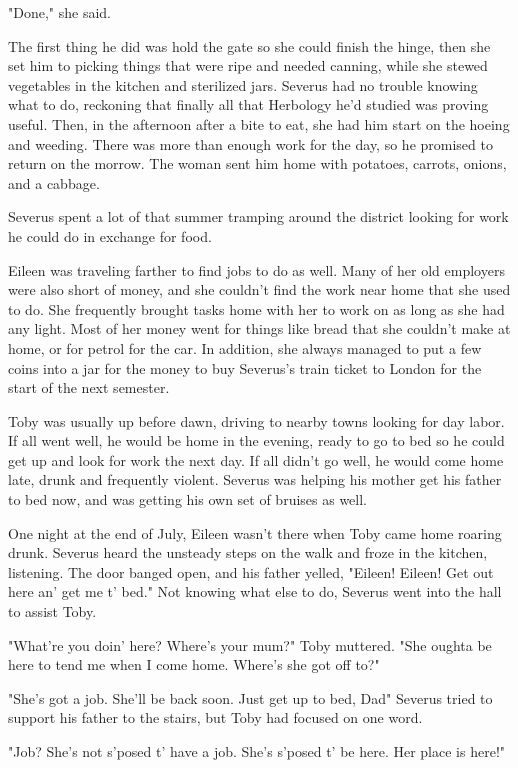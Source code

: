 "Done," she said.

The first thing he did was hold the gate so she could finish the hinge, then she set him to picking things that were ripe and needed canning, while she stewed vegetables in the kitchen and sterilized jars. Severus had no trouble knowing what to do, reckoning that finally all that Herbology he'd studied was proving useful. Then, in the afternoon after a bite to eat, she had him start on the hoeing and weeding. There was more than enough work for the day, so he promised to return on the morrow. The woman sent him home with potatoes, carrots, onions, and a cabbage.

Severus spent a lot of that summer tramping around the district looking for work he could do in exchange for food.

Eileen was traveling farther to find jobs to do as well. Many of her old employers were also short of money, and she couldn't find the work near home that she used to do. She frequently brought tasks home with her to work on as long as she had any light. Most of her money went for things like bread that she couldn't make at home, or for petrol for the car. In addition, she always managed to put a few coins into a jar for the money to buy Severus's train ticket to London for the start of the next semester.

Toby was usually up before dawn, driving to nearby towns looking for day labor. If all went well, he would be home in the evening, ready to go to bed so he could get up and look for work the next day. If all didn't go well, he would come home late, drunk and frequently violent. Severus was helping his mother get his father to bed now, and was getting his own set of bruises as well.

One night at the end of July, Eileen wasn't there when Toby came home roaring drunk. Severus heard the unsteady steps on the walk and froze in the kitchen, listening. The door banged open, and his father yelled, "Eileen! Eileen! Get out here an' get me t' bed." Not knowing what else to do, Severus went into the hall to assist Toby.

"What're you doin' here? Where's your mum?" Toby muttered. "She oughta be here to tend me when I come home. Where's she got off to?"

"She's got a job. She'll be back soon. Just get up to bed, Dad{\el}" Severus tried to support his father to the stairs, but Toby had focused on one word.

"Job? She's not s'posed t' have a job. She's s'posed t' be here. Her place is here!"

